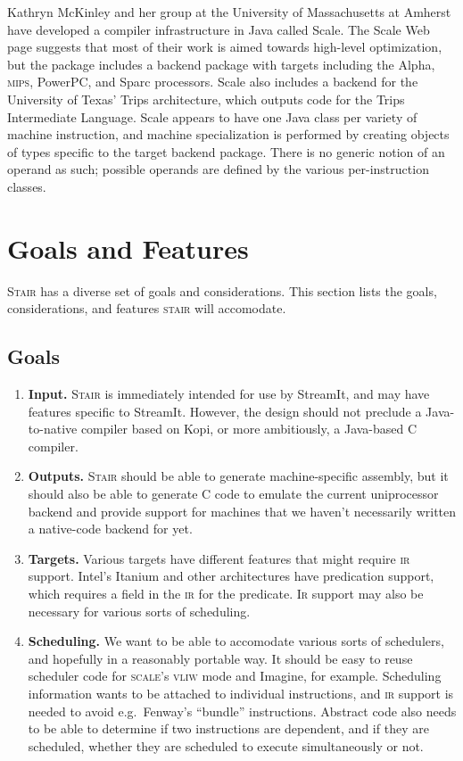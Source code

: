 \documentclass[11pt]{article}
\def\ir{\textsc{ir}}
\def\Ir{\textsc{Ir}}
\def\mips{\textsc{mips}}
\def\scale{\textsc{scale}}
\def\stair{\textsc{stair}}
\def\Stair{\textsc{Stair}}
\def\streamit{Stream\-It}
\def\vliw{\textsc{vliw}}
\begin{document}
Kathryn McKinley and her group at the University of Massachusetts at
Amherst have developed a compiler infrastructure in Java called
Scale\cite{scale-umass}.  The Scale Web page suggests that most of
their work is aimed towards high-level optimization, but the package
includes a backend package with targets including the Alpha, \mips,
PowerPC, and Sparc processors.  Scale also includes a backend for the
University of Texas' Trips architecture, which outputs code for the
Trips Intermediate Language.  Scale appears to have one Java class per
variety of machine instruction, and machine specialization is
performed by creating objects of types specific to the target backend
package.  There is no generic notion of an operand as such; possible
operands are defined by the various per-instruction classes.

\section{Goals and Features}

\Stair{} has a diverse set of goals and considerations.  This section
lists the goals, considerations, and features \stair{} will
accomodate.

\subsection{Goals}

\begin{enumerate}
\item \textbf{Input.}  \Stair{} is immediately intended for
  use by \streamit, and may have features specific to StreamIt.
  However, the design should not preclude a Java-to-native compiler
  based on Kopi, or more ambitiously, a Java-based C compiler.
\item \textbf{Outputs.}  \Stair{} should be able to generate
  machine-specific assembly, but it should also be able to generate C
  code to emulate the current uniprocessor backend and provide support
  for machines that we haven't necessarily written a native-code
  backend for yet.
\item \textbf{Targets.}  Various targets have different features that
  might require \ir{} support.  Intel's Itanium and other architectures
  have predication support, which requires a field in the \ir{} for the
  predicate.  \Ir{} support may also be necessary for various sorts of
  scheduling.
\item \textbf{Scheduling.}  We want to be able to accomodate various
  sorts of schedulers, and hopefully in a reasonably portable way.  It
  should be easy to reuse scheduler code for \scale's \vliw{} mode and
  Imagine, for example.  Scheduling information wants to be attached
  to individual instructions, and \ir{} support is needed to avoid
  e.g.~Fenway's ``bundle'' instructions\cite{fenway}.  Abstract code
  also needs to be able to determine if two instructions are
  dependent, and if they are scheduled, whether they are scheduled to
  execute simultaneously or not.
\end{enumerate}
\end{document}
